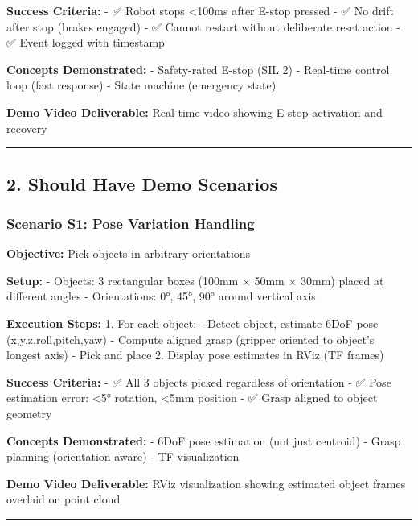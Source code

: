 \documentclass[
]{article}
\begin{document}
\textbf{Success Criteria:} - ✅ Robot stops \textless100ms after E-stop
pressed - ✅ No drift after stop (brakes engaged) - ✅ Cannot restart
without deliberate reset action - ✅ Event logged with timestamp

\textbf{Concepts Demonstrated:} - Safety-rated E-stop (SIL 2) -
Real-time control loop (fast response) - State machine (emergency state)

\textbf{Demo Video Deliverable:} Real-time video showing E-stop
activation and recovery

\begin{center}\rule{0.5\linewidth}{0.5pt}\end{center}

\hypertarget{should-have-demo-scenarios}{%
\subsection{2. Should Have Demo
Scenarios}\label{should-have-demo-scenarios}}

\hypertarget{scenario-s1-pose-variation-handling}{%
\subsubsection{Scenario S1: Pose Variation
Handling}\label{scenario-s1-pose-variation-handling}}

\textbf{Objective:} Pick objects in arbitrary orientations

\textbf{Setup:} - Objects: 3 rectangular boxes (100mm × 50mm × 30mm)
placed at different angles - Orientations: 0°, 45°, 90° around vertical
axis

\textbf{Execution Steps:} 1. For each object: - Detect object, estimate
6DoF pose (x,y,z,roll,pitch,yaw) - Compute aligned grasp (gripper
oriented to object's longest axis) - Pick and place 2. Display pose
estimates in RViz (TF frames)

\textbf{Success Criteria:} - ✅ All 3 objects picked regardless of
orientation - ✅ Pose estimation error: \textless5° rotation,
\textless5mm position - ✅ Grasp aligned to object geometry

\textbf{Concepts Demonstrated:} - 6DoF pose estimation (not just
centroid) - Grasp planning (orientation-aware) - TF visualization

\textbf{Demo Video Deliverable:} RViz visualization showing estimated
object frames overlaid on point cloud

\begin{center}\rule{0.5\linewidth}{0.5pt}\end{center}
\end{document}
